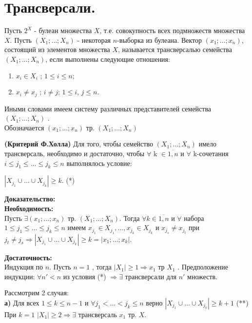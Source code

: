\section{Трансверсали.}

\opri Пусть $2^{X}$ - булеан множества $X$, т.е. совокупность всех подмножеств множества $X$. Пусть $(X_1; \dots; X_n)$ - некоторая $n$-выборка из булеана. Вектор $(x_1; \dots; x_n)$, состоящий из элементов множества $X$, называется трансверсалью семейства $(X_1; \dots; X_n)$, если выполнены следующие отношения:

\begin{enumerate}
\item $x_i \in X_i$ ; $1 \leq i \leq n$;
\item $x_i \neq x_j$ ; $i \neq j$; $1 \leq i$, $j \leq n$.
\end{enumerate}

Иными словами имеем систему различных представителей семейства $(X_1; \dots; X_n)$ .\\
Обозначается $(x_1; \dots; x_n)$ тр. $(X_1; \dots; X_n)$

\thr \textbf{(Критерий Ф.Холла)}
Для того, чтобы семейство $(X_1; \dots; X_n)$ имело трансверсаль, необходимо и достаточно, чтобы $\forall$ k $\in \overline{1,n}$ и $\forall$ k-сочетания $i \leq j_1 \leq \dots \leq j_k \leq n$ выполнялось условие:

\begin{center}
$|X_{j_1} \cup \dots \cup X_{j_k}|\geq k$. (*)
\end{center}

\textbf{Доказательство:}\\

\textbf{Необходимость:}\\
Пусть $\exists (x_1; \dots; x_n)$ тр. $(X_1; \dots; X_n)$. Тогда $\forall k \in \overline{1,n}$ и $\forall$ набора $1 \leq j_1 \leq \dots \leq j_k\leq n$ имеем $x_{j_1} \in X_{j_1}, \dots, x_{j_k} \in X_{j_k}$ и $x_{j_s} \neq x_{j_t}$ при $j_t \neq j_s \Rightarrow |X_{j_1} \cup \dots \cup X_{j_k}| \geq k = |{x_1; \dots; x_k}|$.

\textbf{Достаточность:}\\
Индукция по $n$. Пусть $n=1$ , тогда
$|X_1| \geq 1 \Rightarrow {x_1}$ тр $X_1$ .
Предположение индукции: $\forall n' < n$ из условия (*) $\Rightarrow \exists$ трансверсали для $n'$ множеств. 

Рассмотрим 2 случая:\\

\textbf{а)} Для всех $1 \leq k \leq n-1$ и $\forall j_1 < \dots < j_k \leq n$ верно $|X_{j_1} \cup \dots \cup X_{j_k}| \geq k+1$ (**)
При $k=1$ $|X_1| \geq 2 \Rightarrow \exists$ трансверсаль $x_1$ тр. $X$.

